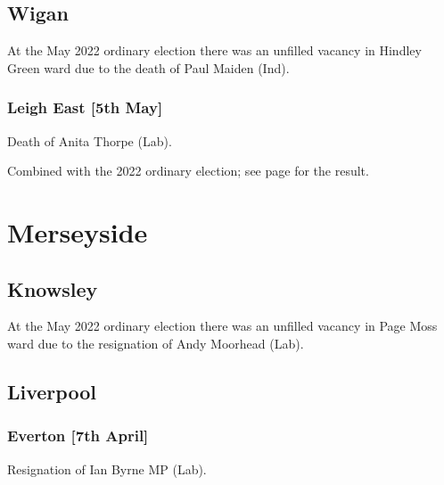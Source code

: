 \documentclass[a4paper,openany]{book}
\begin{document}
\begin{resultsiii}
\subsection*{Wigan}

At the May 2022 ordinary election there was an unfilled vacancy in Hindley Green ward due to the death of Paul Maiden (Ind).%

\subsubsection*{Leigh East \hspace*{\fill}\nolinebreak[1]%
	\enspace\hspace*{\fill}
	[5th May]}


Death of Anita Thorpe (Lab).

Combined with the 2022 ordinary election; see page \pageref{WiganLeighEast} for the result.

\section{Merseyside}

\subsection*{Knowsley}

At the May 2022 ordinary election there was an unfilled vacancy in Page Moss ward due to the resignation of Andy Moorhead (Lab).%

\subsection*{Liverpool}

\subsubsection*{Everton \hspace*{\fill}\nolinebreak[1]%
	\enspace\hspace*{\fill}
	[7th April]}


Resignation of Ian Byrne MP (Lab).


\end{resultsiii}
\end{document}
